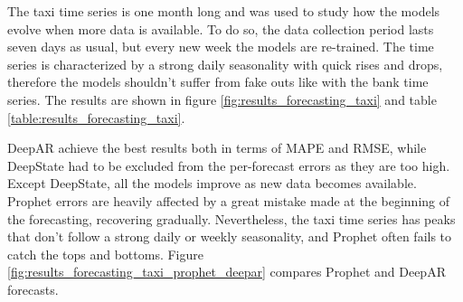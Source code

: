 \documentclass[a4paper, 12pt]{article} %
\begin{document}
	The taxi time series is one month long and was used to study how the models evolve when more data is available. To do so, the data collection period lasts seven days as usual, but every new week the models are re-trained. The time series is characterized by a strong daily seasonality with quick rises and drops, therefore the models shouldn't suffer from fake outs like with the bank time series. The results are shown in figure \ref{fig:results_forecasting_taxi} and table \ref{table:results_forecasting_taxi}. 
	
	DeepAR achieve the best results both in terms of MAPE and RMSE, while DeepState had to be excluded from the per-forecast errors as they are too high. Except DeepState, all the models improve as new data becomes available. Prophet errors are heavily affected by a great mistake made at the beginning of the forecasting, recovering gradually. Nevertheless, the taxi time series has peaks that don't follow a strong daily or weekly seasonality, and Prophet often fails to catch the tops and bottoms. Figure \ref{fig:results_forecasting_taxi_prophet_deepar} compares Prophet and DeepAR forecasts.
	
\end{document}
